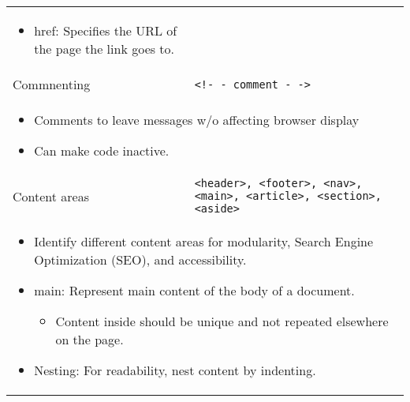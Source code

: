 \begin{summary}
\begin{center}
\begin{tabular}{ll}
{\begin{itemize}
\begin{itemize}
                    \item href: Specifies the URL of the page the link goes to.
                \end{itemize}
            \end{itemize}} \\
            Commnenting & \texttt{<!- - comment - ->} \\
            \multicolumn{2}{p{\linewidth}}{\begin{itemize}
                \item Comments to leave messages w/o affecting browser display 
                \item Can make code inactive.
            \end{itemize}} \\
            Content areas & \texttt{<header>, <footer>, <nav>, <main>, <article>, <section>, <aside>} \\
            \multicolumn{2}{p{\linewidth}}{\begin{itemize}
                \item Identify different content areas for modularity, Search Engine Optimization (SEO), and accessibility. 
                \item main: Represent main content of the body of a document. 
                \begin{itemize}
                    \item Content inside should be unique and not repeated elsewhere on the page.
                \end{itemize}
                \item Nesting: For readability, nest content by indenting.
            \end{itemize}} \\
        \end{tabular}
    \end{center}
\end{summary}

